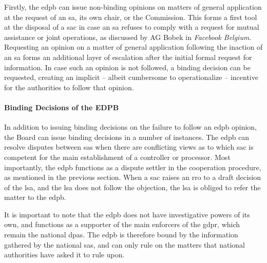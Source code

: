 Firstly, the \gls{edpb} can issue non-binding opinions on matters of general application at the request of an \gls{sa}, its own chair, or the Commission.\autocite[64(2)]{GDPR}
This forms a first tool at the disposal of a \gls{sac} in case an \gls{sa} refuses to comply with a request for mutual assistance or joint operations, as discussed by AG Bobek in \emph{Facebook Belgium}.\autocites[point 120--121]{fbBelgiumAgBobek}[64(2)]{GDPR}
Requesting an opinion on a matter of general application following the inaction of an \gls{sa} forms an additional layer of escalation after the initial formal request for information.
In case such an opinion is not followed, a binding decision can be requested, creating an implicit -- albeit cumbersome to operationalize -- incentive for the authorities to follow that opinion.\autocites[points 120--122]{fbBelgiumAgBobek}[318]{matosbrandaoOnestopshopEuropeanData2023}

\paragraph{Binding Decisions of the EDPB}
In addition to issuing binding decisions on the failure to follow an \gls{edpb} opinion, the Board can issue binding decisions in a number of instances.\autocite[65(1)]{GDPR}
The \gls{edpb} can resolve disputes between \glspl{sa} when there are conflicting views as to which \gls{sac} is competent for the main establishment of a controller or processor.\autocite[65(1)(b)]{GDPR}
Most importantly, the \gls{edpb} functions as a dispute settler in the cooperation procedure, as mentioned in the previous section.
When a \gls{sac} raises an \gls{rro} to a draft decision of the \gls{lsa}, and the \gls{lsa} does not follow the objection, the \gls{lsa} is obliged to refer the matter to the \gls{edpb}.\autocite[65(1)(a)]{GDPR}

It is important to note that the \gls{edpb} does not have investigative powers of its own, and functions as a supporter of the main enforcers of the \gls{gdpr}, which remain the national \glspl{dpa}.\autocite[491--492]{britobastosCentralisedGeneralData2023}
The \gls{edpb} is therefore bound by the information gathered by the national \glspl{sa},\autocite[468]{hofmannmustertScholtenHandbook2023} and can only rule on the matters that national authorities have asked it to rule upon.\autocite[492]{britobastosCentralisedGeneralData2023}

